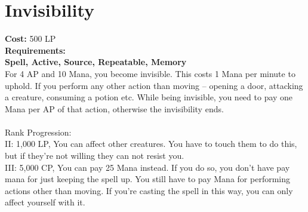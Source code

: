 \section{Invisibility}\label{spell:invisibility}
\textbf{Cost:} 500 LP\\
\textbf{Requirements:}\\
\textbf{Spell, Active, Source, Repeatable, Memory}\\
For 4 AP and 10 Mana, you become invisible.
This costs 1 Mana per minute to uphold.
If you perform any other action than moving -- opening a door, attacking a creature, consuming a potion etc.
While being invisible, you need to pay one Mana per AP of that action, otherwise the invisibility ends.\\
\\
Rank Progression:\\
II: 1,000 LP, You can affect other creatures.
You have to touch them to do this, but if they're not willing they can not resist you.\\

III: 5,000 CP, You can pay 25 Mana instead.
If you do so, you don't have pay mana for just keeping the spell up.
You still have to pay Mana for performing actions other than moving.
If you're casting the spell in this way, you can only affect yourself with it.\\
